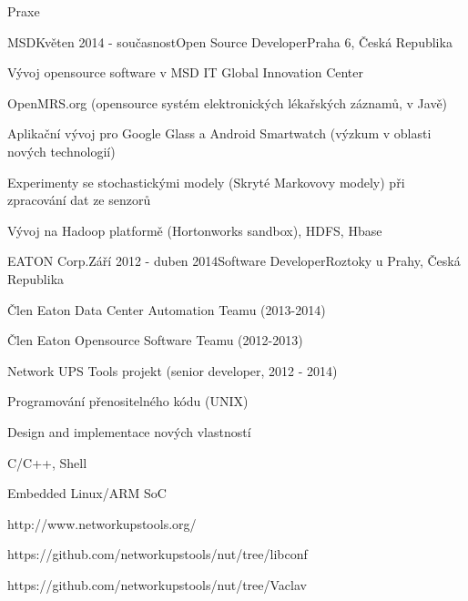 \documentclass{resume} %
\begin{document}
\begin{rSection}{Praxe}

\begin{rSubsection}{MSD}{Kv\v{e}ten 2014 - sou\v{c}asnost}{Open Source Developer}{Praha 6, \v{C}esk\'{a} Republika}
\item V\'{y}voj opensource software v MSD IT Global Innovation Center
\item OpenMRS.org (opensource syst\'{e}m elektronick\'{y}ch l\'{e}ka\v{r}sk\'{y}ch z\'{a}znam\r{u}, v Jav\v{e})
\item Aplika\v{c}n\'{i} v\'{y}voj pro Google Glass a Android Smartwatch (v\'{y}zkum v oblasti nov\'{y}ch technologi\'{i})
\item Experimenty se stochastick\'{y}mi modely (Skryt\'{e} Markovovy modely) p\v{r}i zpracov\'{a}n\'{i} dat ze senzor\r{u}
\item V\'{y}voj na Hadoop platform\v{e} (Hortonworks sandbox), HDFS, Hbase
\end{rSubsection}


\begin{rSubsection}{EATON Corp.}{Z\'{a}\v{r}\'{i} 2012 - duben 2014}{Software Developer}{Roztoky u Prahy, \v{C}esk\'{a} Republika}
\item \v{C}len Eaton Data Center Automation Teamu (2013-2014)
\item \v{C}len Eaton Opensource Software Teamu (2012-2013)
\item Network UPS Tools projekt (senior developer, 2012 - 2014)
\item Programov\'{a}n\'{i} p\v{r}enositeln\'{e}ho k\'{o}du (UNIX)
\item Design and implementace nov\'{y}ch vlastnost\'{i}
\item C/C++, Shell
\item Embedded Linux/ARM SoC
\item http://www.networkupstools.org/
\item https://github.com/networkupstools/nut/tree/libconf
\item https://github.com/networkupstools/nut/tree/Vaclav
\end{rSubsection}



\end{rSection}
\end{document}
